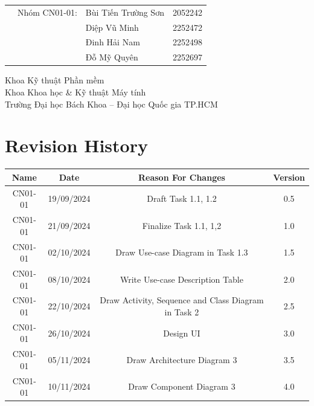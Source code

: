 \begin{titlepage}
\begin{table}[h]
\begin{tabular}{rrll}
			              & Nhóm CN01-01:         & Bùi Tiến Trường Sơn & 2052242 \\
			              &                       & Diệp Vũ Minh        & 2252472 \\
			              &                       & Đinh Hải Nam        & 2252498 \\
			              &                       & Đỗ Mỹ Quyên         & 2252697 \\
		\end{tabular}
	\end{table}

	\vspace{2cm}

	\begin{flushright}
		\begin{minipage}{0.8\textwidth}
			\raggedleft
			\large
			Khoa Kỹ thuật Phần mềm \\
			Khoa Khoa học \& Kỹ thuật Máy tính \\
			Trường Đại học Bách Khoa – Đại học Quốc gia TP.HCM
		\end{minipage}
	\end{flushright}

\end{titlepage}


\newpage
\tableofcontents
\newpage
\section*{Revision History}

\begin{longtable}{|c|c|c|c|}
	\hline
	\textbf{Name} & \textbf{Date} & \textbf{Reason For Changes}                         & \textbf{Version} \\ \hline\hline
	CN01-01       & 19/09/2024    & Draft Task 1.1, 1.2                                 & 0.5              \\ \hline
	CN01-01       & 21/09/2024    & Finalize Task 1.1, 1,2                              & 1.0              \\ \hline
	CN01-01       & 02/10/2024    & Draw Use-case Diagram in Task 1.3                   & 1.5              \\ \hline
	CN01-01       & 08/10/2024    & Write Use-case Description Table                    & 2.0              \\ \hline
	CN01-01       & 22/10/2024    & Draw Activity, Sequence and Class Diagram in Task 2 & 2.5              \\ \hline
	CN01-01       & 26/10/2024    & Design UI                                           & 3.0              \\ \hline
    CN01-01       & 05/11/2024    & Draw Architecture Diagram 3                                    & 3.5              \\ \hline
    CN01-01       & 10/11/2024    & Draw Component Diagram 3                                    & 4.0              \\ \hline
\end{longtable}

